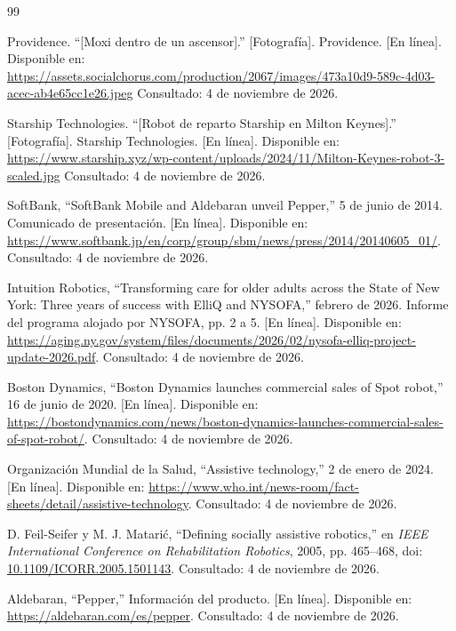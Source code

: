 \documentclass[11pt,a4paper]{article}
\begin{document}
\clearpage
\begingroup
\small
\begin{thebibliography}{99}

Providence. ``[Moxi dentro de un ascensor].'' [Fotografía]. Providence. [En línea]. Disponible en: \url{https://assets.socialchorus.com/production/2067/images/473a10d9-589c-4d03-acec-ab4e65cc1e26.jpeg} Consultado: 4 de noviembre de 2026.

Starship Technologies. ``[Robot de reparto Starship en Milton Keynes].'' [Fotografía]. Starship Technologies. [En línea]. Disponible en: \url{https://www.starship.xyz/wp-content/uploads/2024/11/Milton-Keynes-robot-3-scaled.jpg} Consultado: 4 de noviembre de 2026.

SoftBank, ``SoftBank Mobile and Aldebaran unveil Pepper,'' 5 de junio de 2014. Comunicado de presentación.
[En línea]. Disponible en: \url{https://www.softbank.jp/en/corp/group/sbm/news/press/2014/20140605_01/}. Consultado: 4 de noviembre de 2026.

Intuition Robotics, ``Transforming care for older adults across the State of New York: Three years of success with ElliQ and NYSOFA,'' febrero de 2026. Informe del programa alojado por NYSOFA, pp. 2 a 5.
[En línea]. Disponible en: \url{https://aging.ny.gov/system/files/documents/2026/02/nysofa-elliq-project-update-2026.pdf}. Consultado: 4 de noviembre de 2026.

Boston Dynamics, ``Boston Dynamics launches commercial sales of Spot robot,'' 16 de junio de 2020. [En línea]. Disponible en: \url{https://bostondynamics.com/news/boston-dynamics-launches-commercial-sales-of-spot-robot/}. Consultado: 4 de noviembre de 2026.

Organización Mundial de la Salud, ``Assistive technology,'' 2 de enero de 2024.
[En línea]. Disponible en: \url{https://www.who.int/news-room/fact-sheets/detail/assistive-technology}. Consultado: 4 de noviembre de 2026.

D. Feil-Seifer y M. J. Matarić, ``Defining socially assistive robotics,'' en \emph{IEEE International Conference on Rehabilitation Robotics}, 2005, pp. 465--468, doi: \href{https://doi.org/10.1109/ICORR.2005.1501143}{10.1109/ICORR.2005.1501143}. Consultado: 4 de noviembre de 2026.

Aldebaran, ``Pepper,'' Información del producto.
[En línea]. Disponible en: \url{https://aldebaran.com/es/pepper}. Consultado: 4 de noviembre de 2026.


\end{thebibliography}
\end{document}
